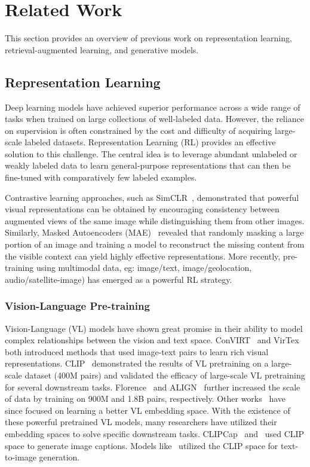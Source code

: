 \section{Related Work}
\label{sec:relatedWork}
This section provides an overview of previous work on representation learning, retrieval-augmented learning, and generative models.
\label{sec:litreview}
\subsection{Representation Learning}
Deep learning models have achieved superior performance across a wide range of tasks when trained on large collections of well-labeled data. However, the reliance on supervision is often constrained by the cost and difficulty of acquiring large-scale labeled datasets. Representation Learning (RL) provides an effective solution to this challenge. The central idea is to leverage abundant unlabeled or weakly labeled data to learn general-purpose representations that can then be fine-tuned with comparatively few labeled examples.

Contrastive learning approaches, such as SimCLR~\cite{chen2020simple}, demonstrated that powerful visual representations can be obtained by encouraging consistency between augmented views of the same image while distinguishing them from other images. Similarly, Masked Autoencoders (MAE)~\cite{he2022masked} revealed that randomly masking a large portion of an image and training a model to reconstruct the missing content from the visible context can yield highly effective representations. More recently, pre-training using multimodal data, eg: image/text, image/geolocation, audio/satellite-image) has emerged as a powerful RL strategy. 

\subsubsection{Vision-Language Pre-training}
Vision-Language (VL) models have shown great promise in their ability to model complex relationships between the vision and text space. ConVIRT~\cite{zhang2022contrastive} and VirTex~\cite{desai2021virtex} both introduced methods that used image-text pairs to learn rich visual representations. CLIP~\cite{radford2021learning} demonstrated the results of VL pretraining on a large-scale dataset (400M pairs) and validated the efficacy of large-scale VL pretraining for several downstream tasks. Florence~\cite{yuan2021florence} and ALIGN~\cite{jia2021scaling} further increased the scale of data by training on 900M and 1.8B pairs, respectively. Other works~\cite{li2021align,yao2021filip,yang2022unified,yang2022vision} have since focused on learning a better VL embedding space. With the existence of these powerful pretrained VL models, many researchers have utilized their embedding spaces to solve specific downstream tasks. CLIPCap~\cite{mokady2021clipcap} and~\cite{cho2022fine} used CLIP space to generate image captions. Models like~\cite{ramesh2022hierarchical,nichol2021glide,wang2022clip} utilized the CLIP space for text-to-image generation. 

